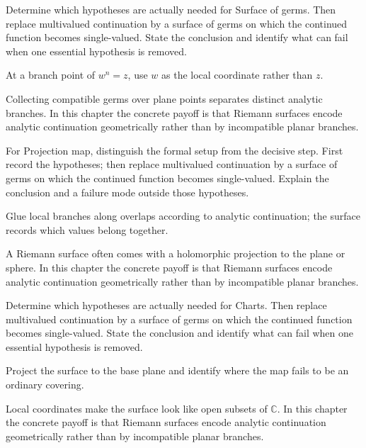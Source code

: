 \begin{exercise}\label{exr:iv22-03}
Determine which hypotheses are actually needed for Surface of germs. Then replace multivalued continuation by a surface of germs on which the continued function becomes single-valued. State the conclusion and identify what can fail when one essential hypothesis is removed.
\end{exercise}
\begin{hint}
At a branch point of \(w^n=z\), use \(w\) as the local coordinate rather than \(z\).
\end{hint}
\begin{solution}
Collecting compatible germs over plane points separates distinct analytic branches. In this chapter the concrete payoff is that Riemann surfaces encode analytic continuation geometrically rather than by incompatible planar branches.
\end{solution}

\begin{exercise}\label{exr:iv22-04}
For Projection map, distinguish the formal setup from the decisive step. First record the hypotheses; then replace multivalued continuation by a surface of germs on which the continued function becomes single-valued. Explain the conclusion and a failure mode outside those hypotheses.
\end{exercise}
\begin{hint}
Glue local branches along overlaps according to analytic continuation; the surface records which values belong together.
\end{hint}
\begin{solution}
A Riemann surface often comes with a holomorphic projection to the plane or sphere. In this chapter the concrete payoff is that Riemann surfaces encode analytic continuation geometrically rather than by incompatible planar branches.
\end{solution}

\begin{exercise}\label{exr:iv22-05}
Determine which hypotheses are actually needed for Charts. Then replace multivalued continuation by a surface of germs on which the continued function becomes single-valued. State the conclusion and identify what can fail when one essential hypothesis is removed.
\end{exercise}
\begin{hint}
Project the surface to the base plane and identify where the map fails to be an ordinary covering.
\end{hint}
\begin{solution}
Local coordinates make the surface look like open subsets of $\mathbb C$. In this chapter the concrete payoff is that Riemann surfaces encode analytic continuation geometrically rather than by incompatible planar branches.
\end{solution}

